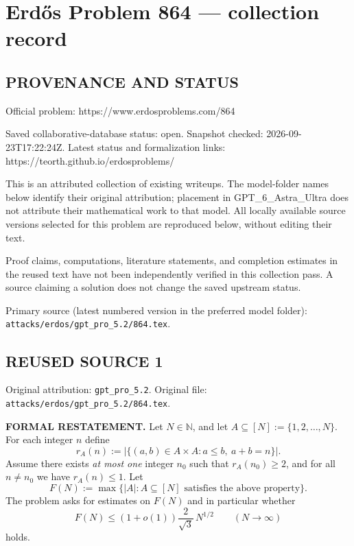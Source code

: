 \section*{Erd\H{o}s Problem 864 --- collection record}

\subsection*{PROVENANCE AND STATUS}
Official problem: https://www.erdosproblems.com/864

Saved collaborative-database status: open.
Snapshot checked: 2026-09-23T17:22:24Z.
Latest status and formalization links: https://teorth.github.io/erdosproblems/

This is an attributed collection of existing writeups. The model-folder names below identify their original attribution; placement in GPT\_6\_Astra\_Ultra does not attribute their mathematical work to that model. All locally available source versions selected for this problem are reproduced below, without editing their text.

Proof claims, computations, literature statements, and completion estimates in the reused text have not been independently verified in this collection pass. A source claiming a solution does not change the saved upstream status.

Primary source (latest numbered version in the preferred model folder): \texttt{attacks/erdos/gpt\_pro\_5.2/864.tex}.

\subsection*{REUSED SOURCE 1}
Original attribution: \texttt{gpt\_pro\_5.2}.
Original file: \texttt{attacks/erdos/gpt\_pro\_5.2/864.tex}.


\noindent\textbf{FORMAL RESTATEMENT.}
Let $N\in\mathbb{N}$, and let $A\subseteq [N]:=\{1,2,\dots,N\}$.  For each integer $n$ define
\[
 r_A(n):=\bigl|\{(a,b)\in A\times A: a\le b,\ a+b=n\}\bigr|.
\]
Assume there exists \emph{at most one} integer $n_0$ such that $r_A(n_0)\ge 2$, and for all $n\ne n_0$ we have $r_A(n)\le 1$.  Let
\[
F(N):=\max\{|A|:A\subseteq [N]\text{ satisfies the above property}\}.
\]
The problem asks for estimates on $F(N)$ and in particular whether
\[
F(N)\le (1+o(1))\frac{2}{\sqrt 3}\,N^{1/2}\qquad (N\to\infty)
\]
holds.


